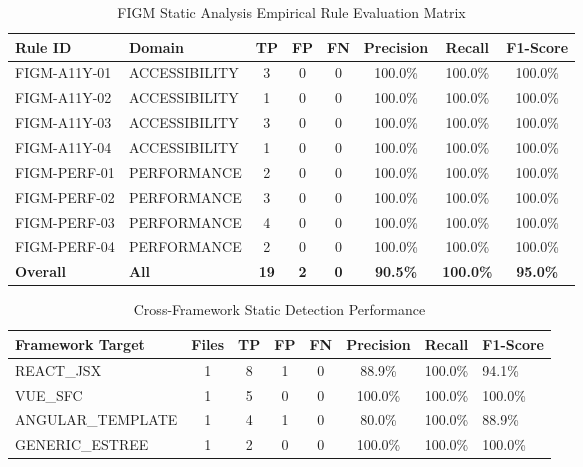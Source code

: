 \begin{table}[htbp]
\centering
\caption{FIGM Static Analysis Empirical Rule Evaluation Matrix}
\label{tab:figm_rule_evaluation}
\begin{tabular}{llcccccc}
\toprule
\textbf{Rule ID} & \textbf{Domain} & \textbf{TP} & \textbf{FP} & \textbf{FN} & \textbf{Precision} & \textbf{Recall} & \textbf{F1-Score} \\
\midrule
FIGM-A11Y-01 & ACCESSIBILITY & 3 & 0 & 0 & 100.0\% & 100.0\% & 100.0\% \\
FIGM-A11Y-02 & ACCESSIBILITY & 1 & 0 & 0 & 100.0\% & 100.0\% & 100.0\% \\
FIGM-A11Y-03 & ACCESSIBILITY & 3 & 0 & 0 & 100.0\% & 100.0\% & 100.0\% \\
FIGM-A11Y-04 & ACCESSIBILITY & 1 & 0 & 0 & 100.0\% & 100.0\% & 100.0\% \\
FIGM-PERF-01 & PERFORMANCE & 2 & 0 & 0 & 100.0\% & 100.0\% & 100.0\% \\
FIGM-PERF-02 & PERFORMANCE & 3 & 0 & 0 & 100.0\% & 100.0\% & 100.0\% \\
FIGM-PERF-03 & PERFORMANCE & 4 & 0 & 0 & 100.0\% & 100.0\% & 100.0\% \\
FIGM-PERF-04 & PERFORMANCE & 2 & 0 & 0 & 100.0\% & 100.0\% & 100.0\% \\
\midrule
\textbf{Overall} & \textbf{All} & \textbf{19} & \textbf{2} & \textbf{0} & \textbf{90.5\%} & \textbf{100.0\%} & \textbf{95.0\%} \\
\bottomrule
\end{tabular}
\end{table}

\begin{table}[htbp]
\centering
\caption{Cross-Framework Static Detection Performance}
\label{tab:figm_framework_performance}
\begin{tabular}{lcccccc}
\toprule
\textbf{Framework Target} & \textbf{Files} & \textbf{TP} & \textbf{FP} & \textbf{FN} & \textbf{Precision} & \textbf{Recall} & \textbf{F1-Score} \\
\midrule
REACT_JSX & 1 & 8 & 1 & 0 & 88.9\% & 100.0\% & 94.1\% \\
VUE_SFC & 1 & 5 & 0 & 0 & 100.0\% & 100.0\% & 100.0\% \\
ANGULAR_TEMPLATE & 1 & 4 & 1 & 0 & 80.0\% & 100.0\% & 88.9\% \\
GENERIC_ESTREE & 1 & 2 & 0 & 0 & 100.0\% & 100.0\% & 100.0\% \\
\bottomrule
\end{tabular}
\end{table}
